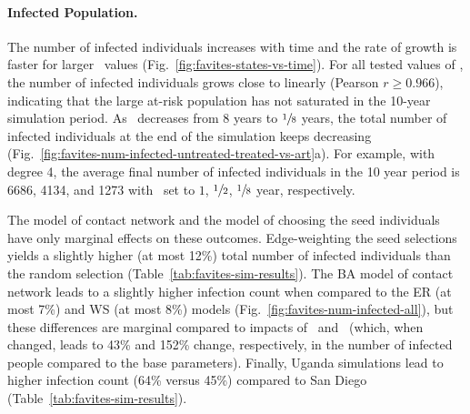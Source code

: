 \paragraph{Infected Population.} The number of infected individuals increases with time and the rate of growth is faster for larger \EART\ values (Fig.~\ref{fig:favites-states-vs-time}). For all tested values of \EART, the number of infected individuals grows close to linearly (Pearson $r\ge 0.966$), indicating that the large at-risk population has not saturated in the 10-year simulation period.  As \EART\ decreases from 8 years to $\sfrac{1}{8}$ years, the total number of infected individuals at the end of the simulation keeps decreasing (Fig.~\ref{fig:favites-num-infected-untreated-treated-vs-art}a). For example, with degree 4, the average final number of infected individuals in the 10 year period is 6686, 4134, and 1273 with \EART\ set to $1$, $\sfrac{1}{2}$, $\sfrac{1}{8}$ year, respectively.

The model of contact network and the model of choosing the seed individuals have only marginal effects on these outcomes. Edge-weighting the seed selections yields a slightly higher (at most 12\%) total number of infected individuals than the random selection (Table~\ref{tab:favites-sim-results}). The \gls{BA} model of contact network leads to a slightly higher infection count when compared to the \gls{ER} (at most 7\%) and \gls{WS}  (at most 8\%) models (Fig.~\ref{fig:favites-num-infected-all}), but these differences are marginal compared to impacts of \EART\ and \ED\ (which, when changed, leads to  43\% and 152\% change, respectively, in the number of infected people compared to the base parameters). Finally, Uganda simulations lead to higher infection count (64\% versus 45\%) compared to San Diego (Table~\ref{tab:favites-sim-results}).


